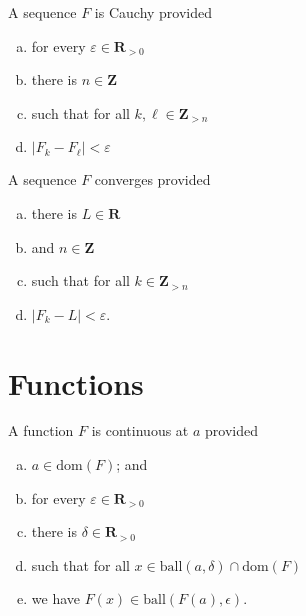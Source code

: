 \documentclass[letterpaper,landscape,9pt,fleqn]{extarticle}
\newcommand{\dom}{\mathrm{dom}}
\newcommand{\reals}{\mathbf{R}}
\newcommand{\ball}{\mathrm{ball}}
\newcommand{\integers}{\mathbf{Z}}
\newenvironment{alphalist}{
  \begin{enumerate}[(a)]
    \addtolength{\itemsep}{-1.0\itemsep}}
  {\end{enumerate}}
\begin{document}
\begin{multicols*}{3}
\begin{description}[\itemsep=0em]
\item[Cauchy] A sequence $F$ is Cauchy provided
\begin{alphalist}
    \item for every $\varepsilon \in \reals_{>0}$
    \item there is $n \in \integers$
    \item such that for all $k,\ell \in \integers_{>n}$
    \item $|F_k - F_\ell| < \varepsilon$
\end{alphalist}

\item[Converges] A sequence $F$ converges provided
\begin{alphalist}
    \item there is $L \in \reals$
    \item and $n \in \integers$
    \item such that for all $k \in \integers_{>n}$
    \item $|F_k - L | < \varepsilon$.
\end{alphalist}
\end{description}

\section*{Functions}   
\begin{description}[\itemsep=0em]
    \item[Continuous] A function $F$ is continuous at $a$ provided
    \begin{alphalist}
        \item $a \in \dom(F)$; and
        \item for every $\varepsilon \in \reals_{>0}$
        \item there is $\delta \in \reals_{>0}$
        \item such that for all $x \in \ball(a,\delta) \cap \dom(F)$
        \item we have $F(x) \in \ball(F(a), \epsilon)$.
    \end{alphalist}


\end{description}
\end{multicols*}
\end{document}

